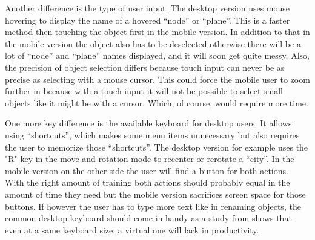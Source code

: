 Another difference is the type of user input.
The desktop version uses mouse hovering to display the name of a hovered \enquote{\gls{node}} or \enquote{\gls{plane}}.
This is a faster method then touching the object first in the mobile version. 
In addition to that in the mobile version the object also has to be deselected otherwise there will be a lot of \enquote{\gls{node}} and \enquote{\gls{plane}} names displayed, and it will soon get quite messy.
Also, the precision of object selection differs because touch input can never be as precise as selecting with a mouse cursor. 
This could force the mobile user to zoom further in because with a touch input it will not be possible to select small objects like it might be with a cursor.
Which, of course, would require more time.

One more key difference is the available keyboard for desktop users.
It allows using \enquote{\glspl{shortcut}}, which makes some menu items unnecessary but also requires the user to memorize those \enquote{\glspl{shortcut}}.
The desktop version for example uses the "R" key in the move and rotation mode to recenter or rerotate a \enquote{\gls{city}}.
In the mobile version on the other side the user will find a button for both actions. 
With the right amount of training both actions should probably equal in the amount of time they need but the mobile version sacrifices screen space for those buttons.
If however the user has to type more text like in renaming objects, the common desktop keyboard should come in handy as a study from \cite{kim2014differences} shows that even at a same keyboard size, a virtual one will lack in productivity.
